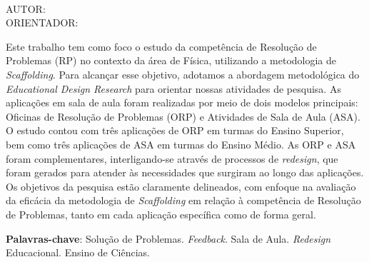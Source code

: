 \begin{resumo}[RESUMO]
\vspace{2em}
\begin{center}
\textbf{\expandafter\MakeUppercase\expandafter{\imprimirtitulo}}\\
\vspace{1em}
AUTOR: \imprimirautor\\
ORIENTADOR: \imprimirorientador
\end{center}
\vspace{1em}
Este trabalho tem como foco o estudo da competência de Resolução de Problemas (RP) no contexto da área de Física, utilizando a metodologia de \textit{Scaffolding}. Para alcançar esse objetivo, adotamos a abordagem metodológica do \textit{Educational Design Research} para orientar nossas atividades de pesquisa. As aplicações em sala de aula foram realizadas por meio de dois modelos principais: Oficinas de Resolução de Problemas (ORP) e Atividades de Sala de Aula (ASA). O estudo contou com três aplicações de ORP em turmas do Ensino Superior, bem como três aplicações de ASA em turmas do Ensino Médio. As ORP e ASA foram complementares, interligando-se através de processos de \textit{redesign}, que foram gerados para atender às necessidades que surgiram ao longo das aplicações. Os objetivos da pesquisa estão claramente delineados, com enfoque na avaliação da eficácia da metodologia de \textit{Scaffolding} em relação à competência de Resolução de Problemas, tanto em cada aplicação específica como de forma geral.

\vspace{2em}
\textbf{Palavras-chave}: Solução de Problemas. \textit{Feedback}. Sala de Aula. \textit{Redesign} Educacional. Ensino de Ciências.
\end{resumo}